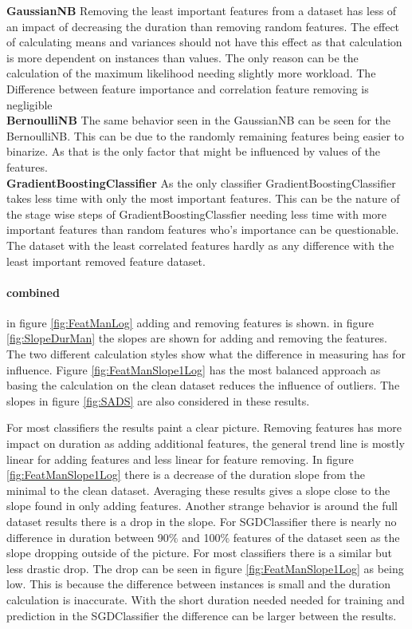 \documentclass[a4paper,10pt]{article}
\begin{document}
\textbf{GaussianNB} Removing the least important features from a dataset has less of an impact of decreasing the duration than removing random features. The effect of calculating means and variances should not have this effect as that calculation is more dependent on instances than values. The only reason can be the calculation of the maximum likelihood needing slightly more workload. The Difference between feature importance and correlation feature removing is negligible \\

\textbf{BernoulliNB} The same behavior seen in the GaussianNB can be seen for the BernoulliNB. This can be due to the randomly remaining features being easier to binarize. As that is the only factor that might be influenced by values of the features. \\

\textbf{GradientBoostingClassifier} As the only classifier GradientBoostingClassifier takes less time with only the most important features. This can be the nature of the stage wise steps of GradientBoostingClassfier needing less time with more important features than random features who's importance can be questionable. The dataset with the least correlated features hardly as any difference with the least important removed feature dataset.\\


\paragraph{combined}
in figure \ref{fig:FeatManLog} adding and removing features is shown.
in figure \ref{fig:SlopeDurMan} the slopes are shown for adding and removing the features. The two different calculation styles show what the difference in measuring has for influence. Figure \ref{fig:FeatManSlope1Log} has the most balanced approach as basing the calculation on the clean dataset reduces the influence of outliers. The slopes in figure \ref{fig:SADS} are also considered in these results.

For most classifiers the results paint a clear picture. Removing features has more impact on duration as adding additional features, the general trend line is mostly linear for adding features and less linear for feature removing. In figure \ref{fig:FeatManSlope1Log} there is a decrease of the duration slope from the minimal to the clean dataset. Averaging these results gives a slope close to the slope found in only adding features. Another strange behavior is around the full dataset results there is a drop in the slope. For SGDClassifier there is nearly no difference in duration between 90$\%$ and 100$\%$ features of the dataset seen as the slope dropping outside of the picture. For most classifiers there is a similar but less drastic drop. The drop can be seen in figure \ref{fig:FeatManSlope1Log} as being low. This is because the difference between instances is small and the duration calculation is inaccurate. With the short duration needed needed for training and prediction in the SGDClassifier the difference can be larger between the results. 
\end{document}
